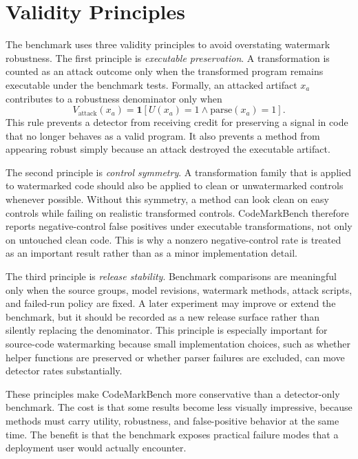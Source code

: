 \section{Validity Principles}

The benchmark uses three validity principles to avoid overstating watermark robustness. The first principle is \emph{executable preservation}. A transformation is counted as an attack outcome only when the transformed program remains executable under the benchmark tests. Formally, an attacked artifact $x_a$ contributes to a robustness denominator only when
\begin{equation}
  V_{\mathrm{attack}}(x_a)=\mathbf{1}[U(x_a)=1 \wedge \mathrm{parse}(x_a)=1].
\end{equation}
This rule prevents a detector from receiving credit for preserving a signal in code that no longer behaves as a valid program. It also prevents a method from appearing robust simply because an attack destroyed the executable artifact.

The second principle is \emph{control symmetry}. A transformation family that is applied to watermarked code should also be applied to clean or unwatermarked controls whenever possible. Without this symmetry, a method can look clean on easy controls while failing on realistic transformed controls. CodeMarkBench therefore reports negative-control false positives under executable transformations, not only on untouched clean code. This is why a nonzero negative-control rate is treated as an important result rather than as a minor implementation detail.

The third principle is \emph{release stability}. Benchmark comparisons are meaningful only when the source groups, model revisions, watermark methods, attack scripts, and failed-run policy are fixed. A later experiment may improve or extend the benchmark, but it should be recorded as a new release surface rather than silently replacing the denominator. This principle is especially important for source-code watermarking because small implementation choices, such as whether helper functions are preserved or whether parser failures are excluded, can move detector rates substantially.

These principles make CodeMarkBench more conservative than a detector-only benchmark. The cost is that some results become less visually impressive, because methods must carry utility, robustness, and false-positive behavior at the same time. The benefit is that the benchmark exposes practical failure modes that a deployment user would actually encounter.

